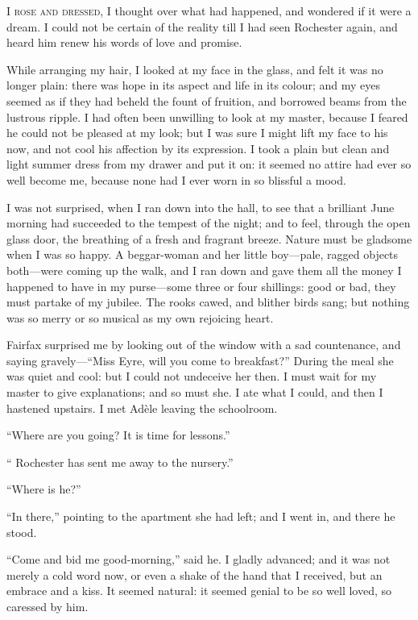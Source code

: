 
 \textsc{I rose and dressed,} I thought over what had happened, and wondered if
it were a dream.  I could not be certain of the reality till I had seen
\Mr{} Rochester again, and heard him renew his words of love and promise.

While arranging my hair, I looked at my face in the glass, and felt it
was no longer plain: there was hope in its aspect and life in its
colour; and my eyes seemed as if they had beheld the fount of fruition,
and borrowed beams from the lustrous ripple.  I had often been unwilling
to look at my master, because I feared he could not be pleased at my
look; but I was sure I might lift my face to his now, and not cool his
affection by its expression.  I took a plain but clean and light summer
dress from my drawer and put it on: it seemed no attire had ever so well
become me, because none had I ever worn in so blissful a mood.

I was not surprised, when I ran down into the hall, to see that a
brilliant June morning had succeeded to the tempest of the night; and to
feel, through the open glass door, the breathing of a fresh and fragrant
breeze.  Nature must be gladsome when I was so happy.  A beggar-woman
and her little boy---pale, ragged objects both---were coming up the
walk, and I ran down and gave them all the money I happened to have in
my purse---some three or four shillings: good or bad, they must partake
of my jubilee.  The rooks cawed, and blither birds sang; but nothing was
so merry or so musical as my own rejoicing heart.

\Mrs{} Fairfax surprised me by looking out of the window with a sad
countenance, and saying gravely---\enquote{Miss Eyre, will you come to
	breakfast?}  During the meal she was quiet and cool: but I could not
undeceive her then.  I must wait for my master to give explanations; and
so must she.  I ate what I could, and then I hastened upstairs.  I met
Adèle leaving the schoolroom.

\enquote{Where are you going?  It is time for lessons.}

\enquote{\Mr{} Rochester has sent me away to the nursery.}

\enquote{Where is he?}

\enquote{In there,} pointing to the apartment she had left; and I went
in, and there he stood.

\enquote{Come and bid me good-morning,} said he.  I gladly advanced; and
it was not merely a cold word now, or even a shake of the hand that I
received, but an embrace and a kiss.  It seemed natural: it seemed
genial to be so well loved, so caressed by him.

